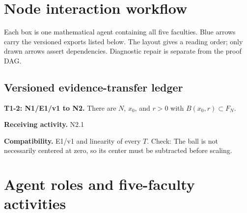 \documentclass[preprint,12pt,aps,pra,showkeys,amsmath,amssymb,superscriptaddress,floatfix]{revtex4-2}
\theoremstyle{definition}
\theoremstyle{remark}
\newcommand{\field}[2]{\par\smallskip\noindent\textbf{#1.} #2\par}
\begin{document}
\clearpage\section{Node interaction workflow}

\begin{center}\end{center}

Each box is one mathematical agent containing all five faculties. Blue
arrows carry the versioned exports listed below. The layout gives a
reading order; only drawn arrows assert dependencies. Diagnostic repair
is separate from the proof DAG.

\subsection{Versioned evidence-transfer ledger}

\begingroup\small\linespread{1.05}\selectfont

\field{T1-2: N1/E1/v1 to N2}{There are \(N\), \(x_0\), and \(r>0\) with \(B(x_0,r)\subset F_N\).}

\field{Receiving activity}{N2.1}

\field{Compatibility}{E1/v1 and linearity of every \(T\). Check: The ball is not necessarily
centered at zero, so its center must be subtracted before scaling.}

\endgroup

\clearpage\section{Agent roles and five-faculty activities}\begingroup\small\linespread{1.05}\selectfont{}
\end{document}
